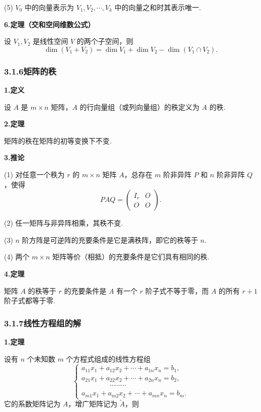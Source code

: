 \documentclass[UTF8, 12pt, fontset=fandol, oneside]{ctexart}
\begin{document}
(5) $V_0$ 中的向量表示为 $V_1,V_2,\cdots,V_k$ 中的向量之和时其表示唯一.

\noindent\textbf{6.\quad 定理（交和空间维数公式）}

设 $V_1,V_2$ 是线性空间 $V$ 的两个子空间，则
\[
\dim(V_1+V_2)=\dim V_1+\dim V_2-\dim(V_1\cap V_2).
\]

\subsubsection*{3.1.6\quad 矩阵的秩}

\noindent\textbf{1.\quad 定义}

设 $A$ 是 $m\times n$ 矩阵，$A$ 的行向量组（或列向量组）的秩定义为 $A$ 的秩.

\noindent\textbf{2.\quad 定理}

矩阵的秩在矩阵的初等变换下不变.

\noindent\textbf{3.\quad 推论}

(1) 对任意一个秩为 $r$ 的 $m\times n$ 矩阵 $A$，总存在 $m$ 阶非异阵 $P$ 和 $n$ 阶非异阵 $Q$，使得
\[
PAQ=
\begin{pmatrix}
I_r & O\\
O & O
\end{pmatrix}.
\]

(2) 任一矩阵与非异阵相乘，其秩不变.

(3) $n$ 阶方阵是可逆阵的充要条件是它是满秩阵，即它的秩等于 $n$.

(4) 两个 $m\times n$ 矩阵等价（相抵）的充要条件是它们具有相同的秩.

\noindent\textbf{4.\quad 定理}

矩阵 $A$ 的秩等于 $r$ 的充要条件是 $A$ 有一个 $r$ 阶子式不等于零，而 $A$ 的所有 $r+1$ 阶子式都等于零.

\subsubsection*{3.1.7\quad 线性方程组的解}

\noindent\textbf{1.\quad 定理}

设有 $n$ 个未知数 $m$ 个方程式组成的线性方程组
\[
\left\{
\begin{array}{l}
a_{11}x_1+a_{12}x_2+\cdots+a_{1n}x_n=b_1,\\
a_{21}x_1+a_{22}x_2+\cdots+a_{2n}x_n=b_2,\\
\hspace{4em}\cdots\cdots\cdots\\
a_{m1}x_1+a_{m2}x_2+\cdots+a_{mn}x_n=b_m.
\end{array}
\right.
\]
它的系数矩阵记为 $A$，增广矩阵记为 $\widetilde A$，则
\end{document}
